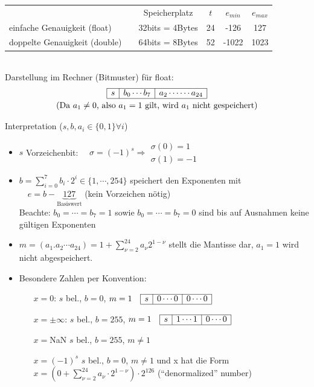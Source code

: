\begin{tabular}{l@{}cccc@{}}
  & Speicherplatz & $t$ & $e_{min}$ & $e_{max}$ \\
  \cmidrule{2-5}
  einfache Genauigkeit (float) \index{floating point} & 32bits = 4Bytes & 24 &-126 & 127 \\
  doppelte  Genauigkeit (double)~~\index{double} & 64bits = 8Bytes& 52 & -1022 & 1023
\end{tabular}\\

Darstellung im Rechner (Bitmuster) für float:
\begin{gather*}
  \floatbox{s}{b_0\cdots b_7}{a_2\cdots\cdots a_{24}}\\
  \text{(Da $a_1\neq 0$, also $a_1=1$ gilt, wird $a_1$ nicht gespeichert)}
\end{gather*}

Interpretation ($s,b,a_i\in\{0,1\} \forall i$)
\begin{itemize}
\item $s$ Vorzeichenbit: 
  $\quad \sigma=(-1)^s\Rightarrow 
  \begin{array}{l}
    \sigma(0)=1 \\
    \sigma(1)=-1
  \end{array} $
\item $b=\sum_{i=0}^{7}b_i\cdot2^i \in \{1, \cdots, 254\}$ speichert den Exponenten mit \\
  $ \quad e = b-\underbrace{127}_\text{Basiswert}$ (kein Vorzeichen nötig) \\
  Beachte: $b_0=\cdots=b_7=1$ sowie $b_0=\cdots=b_7=0$ sind bis auf Ausnahmen keine gültigen Exponenten
\item $m=(a_1.a_2\cdots a_{24})=1+\sum_{\nu=2}^{24}a_{\nu}2^{1-\nu}$ stellt die Mantisse dar, $a_1=1$ wird nicht abgespeichert.
\item Besondere Zahlen per Konvention:
  \begin{itemize}
  \item[$x=0$:] $s$ bel., $b=0$, $m=1 \quad \floatbox{s}{0\cdots0}{0\cdots0}$
  \item[$x=\pm\infty$:]  $s$ bel., $b=255$, $m=1  \quad \floatbox{s}{1\cdots1}{0\cdots0}$
  \item[$x=$NaN] $s$ bel., $b=255$, $m\neq 1$
  \item[$x=(-1)^s$] $s$ bel., $b=0$, $m\neq 1$ und x hat die Form $x=(0+\sum_{\nu=2}^{24}a_{\nu}\cdot 2^{1-\nu})\cdot 2^{126}$ (\enquote{denormalized} number)
  \end{itemize}
\end{itemize}

